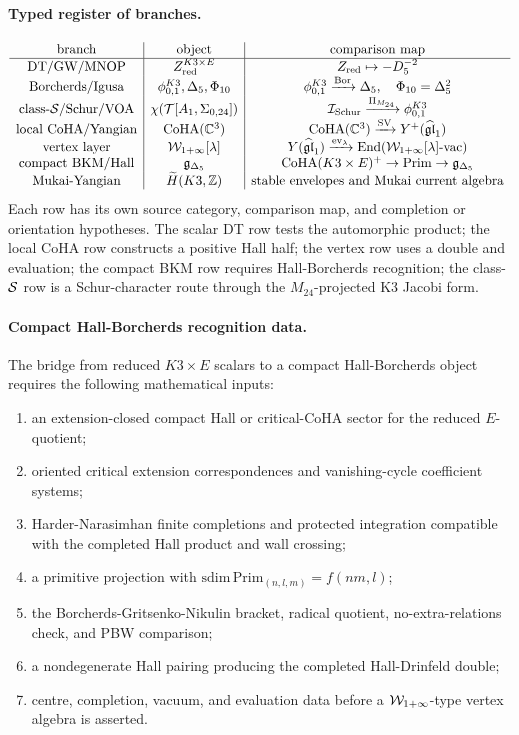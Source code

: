 \paragraph{Typed register of branches.}
\[
\begin{array}{c|c|c}
\text{branch} & \text{object} & \text{comparison map}\\ \hline
\mathrm{DT}/\mathrm{GW}/\mathrm{MNOP} & Z^{K3\times E}_{\mathrm{red}} &
Z_{\mathrm{red}}\mapsto -D_5^{-2}\\
\text{Borcherds/Igusa} & \phi_{0,1}^{K3},\Delta_5,\Phi_{10} &
\phi_{0,1}^{K3}\xrightarrow{\operatorname{Bor}}\Delta_5,\quad
\Phi_{10}=\Delta_5^2\\
\text{class-}\mathcal{S}/\text{Schur/VOA} &
\chi(\mathcal{T}[A_1,\Sigma_{0,24}]) &
\mathcal{I}_{\mathrm{Schur}}\xrightarrow{\Pi_{M_{24}}}\phi_{0,1}^{K3}\\
\text{local CoHA/Yangian} & \mathrm{CoHA}(\mathbb{C}^3) &
\mathrm{CoHA}(\mathbb{C}^3)\xrightarrow{\mathrm{SV}}Y^+(\widehat{\mathfrak{gl}}_1)\\
\text{vertex layer} & \mathcal{W}_{1+\infty}[\lambda] &
Y(\widehat{\mathfrak{gl}}_1)\xrightarrow{\mathrm{ev}_\lambda}
\operatorname{End}(\mathcal{W}_{1+\infty}[\lambda]\text{-}\mathrm{vac})\\
\text{compact BKM/Hall} & \mathfrak{g}_{\Delta_5} &
\mathrm{CoHA}(K3\times E)^+\to\mathrm{Prim}\to\mathfrak{g}_{\Delta_5}\\
\text{Mukai-Yangian} & \widetilde H(K3,\mathbb{Z}) &
\text{stable envelopes and Mukai current algebra}
\end{array}
\]
Each row has its own source category, comparison map, and completion or
orientation hypotheses.  The scalar DT row tests the automorphic product;
the local CoHA row constructs a positive Hall half; the vertex row uses a
double and evaluation; the compact BKM row requires Hall-Borcherds
recognition; the class-\(\mathcal{S}\) row is a Schur-character route through the
\(M_{24}\)-projected K3 Jacobi form.

\paragraph{Compact Hall-Borcherds recognition data.}
The bridge from reduced \(K3\times E\) scalars to a compact Hall-Borcherds
object requires the following mathematical inputs:
\begin{enumerate}\itemsep2pt
  \item an extension-closed compact Hall or critical-CoHA sector for the
  reduced \(E\)-quotient;
  \item oriented critical extension correspondences and vanishing-cycle
  coefficient systems;
  \item Harder-Narasimhan finite completions and protected integration
  compatible with the completed Hall product and wall crossing;
  \item a primitive projection with
  \(\mathrm{sdim}\,\mathrm{Prim}_{(n,l,m)}=f(nm,l)\);
  \item the Borcherds-Gritsenko-Nikulin bracket, radical quotient,
  no-extra-relations check, and PBW comparison;
  \item a nondegenerate Hall pairing producing the completed
  Hall-Drinfeld double;
  \item centre, completion, vacuum, and evaluation data before a
  \(\mathcal{W}_{1+\infty}\)-type vertex algebra is asserted.
\end{enumerate}
